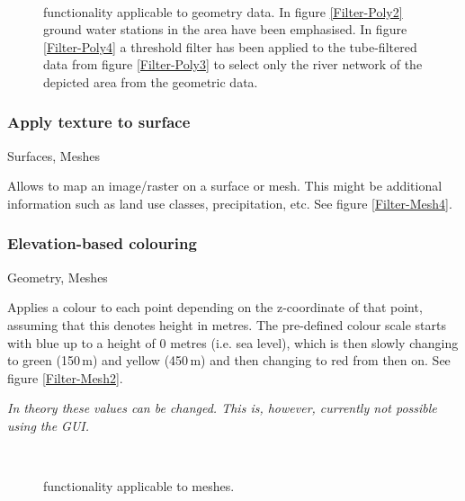 \begin{figure}[tb]
\begin{center}
\enspace
{} \\
\enspace
{}
\end{center}
\caption{\ogs functionality applicable to geometry data. In figure \ref{Filter-Poly2} ground water stations in the area have been emphasised. In figure \ref{Filter-Poly4} a threshold filter has been applied to the tube-filtered data from figure \ref{Filter-Poly3} to select only the river network of the depicted area from the geometric data.} \label{fig:filter:poly}
\end{figure}

\subsubsection{Apply texture to surface}
 Surfaces, Meshes

 Allows to map an image/raster on a surface or mesh. This might be additional information such as land use classes, precipitation, etc. See figure \ref{Filter-Mesh4}.

\subsubsection{Elevation-based colouring}
 Geometry, Meshes

 Applies a colour to each point depending on the z-coordinate of that point, assuming that this denotes height in metres. The pre-defined colour scale starts with blue up to a height of $0$ metres (i.e. sea level), which is then slowly changing to green (150\,m) and yellow (450\,m) and then changing to red from then on. See figure \ref{Filter-Mesh2}.

 \emph{In theory these values can be changed. This is, however, currently not possible using the GUI.}

\begin{figure}[tb]
\begin{center}
\enspace
{} \\
\enspace
{}
\end{center}
\caption{\ogs functionality applicable to meshes.} \label{fig:filter:mesh}
\end{figure}

